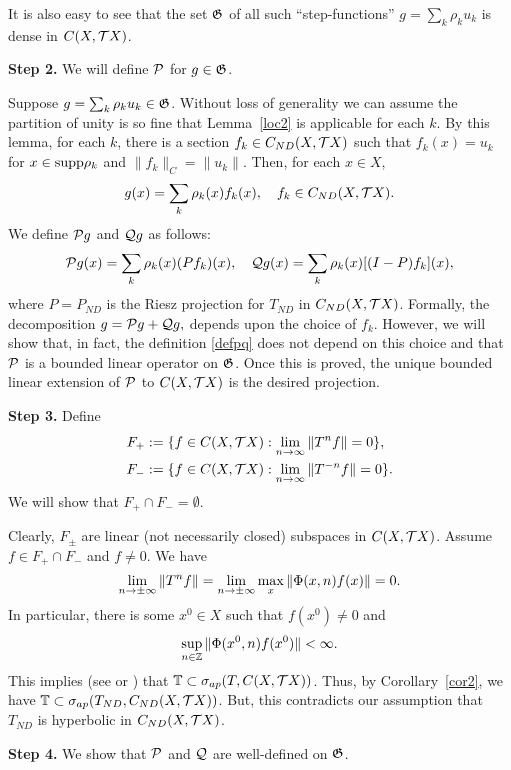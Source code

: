 \begin{pf}
It is also easy to see that the set $\frak G$ of all
such ``step-functions'' $g=\sum_k \rho_k u_k$ is dense in
$C(X,{{\cal{T}}X})$.

{\bf Step 2.} We will  define ${\cal{P}}$ for $g\in\frak G$.

Suppose $g=\sum_k \rho_k u_k\in\frak G$.
Without loss of generality we can assume the partition
of unity is so fine that
 Lemma~\ref{loc2} is applicable for each $k$. By this lemma,
 for each
$k$, there is a section $f_k \in C_{ND}(X,{{\cal{T}}X})$ such that
$f_k(x)= u_k$ for $x\in \hbox{\rm supp} \rho_k$ and $\| f_k \|_C = \|u_k \|$.
Then, for each $x\in X$,
\begin{equation}\label{deff}
g(x) = \sum_k \rho_k (x) f_k(x),\quad f_k\in{C_{ND}(X,{{\cal{T}}X})}.
\end{equation}
We define ${\cal{P}} g$ and ${\cal{Q}} g$ as follows:
\begin{equation}\label{defpq}
{\cal{P}} g(x) = \sum_k \rho_k(x) (Pf_k)(x), \quad {\cal{Q}} g(x) =
\sum_k \rho_k (x)[(I-P) f_k](x),
\end{equation}
where $P=P_{ND}$ is the Riesz projection for $T_{ND}$ in ${C_{ND}(X,{{\cal{T}}X})}$.
Formally, the decomposition
$g={\cal{P}} g+ {\cal{Q}} g,$  depends upon
the choice of $f_k$. However,
we will show that, in fact, the definition
\eqref{defpq}
does not depend on this  choice and that
${\cal{P}}$  is a bounded linear operator on $\frak G$.
Once this is proved,
the unique bounded linear
extension of  ${\cal{P}}$
to ${C(X,{{\cal{T}}X})}$ is the desired projection.

{\bf Step 3.} Define
\begin{eqnarray*}
F_{+} &: = \{f\in C(X,{{\cal{T}}X}):\lim\sb{n\to\infty}\| T^n f\| =0\},\\
F_{-} &: = \{f\in C(X,{{\cal{T}}X}):\lim\sb{n\to\infty}\| T^{-n}f\| =0\}.
\end{eqnarray*}
We will show that $F_{+} \cap F_{-} = \emptyset$.

Clearly, $F_\pm$ are linear (not necessarily closed)
subspaces in
$C(X,{{\cal{T}}X})$.
Assume $f\in F_{+} \cap F_{-}$ and $ f\neq 0$.
We have
$$
\lim\sb{n\to\pm\infty}\|T^nf\| =
\lim\sb{n\to\pm\infty}\max_x \| \Phi(x,n)
f(x) \| =0.
$$
In particular, there is some $x^0 \in X$ such that $f(x^0) \neq 0$
and
$$
\sup\sb{n\in{\Bbb{Z}}} \| \Phi(x^0,n) f(x^0) \| < \infty.
$$
This implies (see \cite{CS} or \cite{Mane}) that
${\Bbb{T}} \subset \sigma_{ap} (T, C(X,{{\cal{T}}X}))$. Thus,
by Corollary~\ref{cor2}, we have
${\Bbb{T}} \subset\sigma_{ap} (T_{ND}, C_{ND}(X,{{\cal{T}}X}))$. But, this
contradicts our assumption that $T_{ND}$ is hyperbolic in ${C_{ND}(X,{{\cal{T}}X})}$.

{\bf Step 4.} We show that ${\cal{P}}$ and ${\cal{Q}}$ are
well-defined on $\frak G$.


\end{pf}
